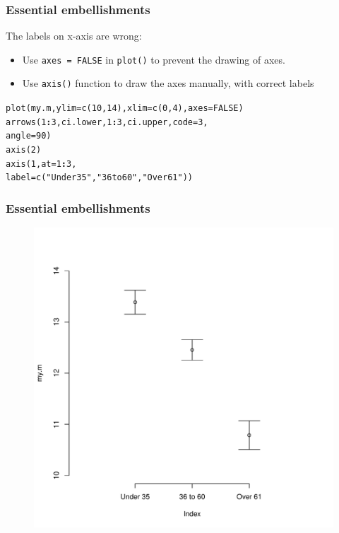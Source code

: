 \documentclass{beamer}\usepackage[]{graphicx}\usepackage[]{color}
\makeatletter
\newcommand{\hlnum}[1]{\textcolor[rgb]{0.533,0,0.133}{#1}}%
\newcommand{\hlstr}[1]{\textcolor[rgb]{0.667,0.267,0}{#1}}%
\newcommand{\hlopt}[1]{\textcolor[rgb]{0,0,0}{\textbf{#1}}}%
\newcommand{\hlstd}[1]{\textcolor[rgb]{0,0,0}{#1}}%
\newcommand{\hlkwc}[1]{\textcolor[rgb]{0,0,0.4}{#1}}%
\newcommand{\hlkwd}[1]{\textcolor[rgb]{0,0.267,0.4}{#1}}%
\newenvironment{kframe}{%
 \def\at@end@of@kframe{}%
 \ifinner\ifhmode%
  \def\at@end@of@kframe{\end{minipage}}%
  \begin{minipage}{\columnwidth}%
 \fi\fi%
 \def\FrameCommand##1{\hskip\@totalleftmargin \hskip-\fboxsep
 \colorbox{shadecolor}{##1}\hskip-\fboxsep
     \hskip-\linewidth \hskip-\@totalleftmargin \hskip\columnwidth}%
 \MakeFramed {\advance\hsize-\width
   \@totalleftmargin\z@ \linewidth\hsize
   \@setminipage}}%
 {\par\unskip\endMakeFramed%
 \at@end@of@kframe}
\newenvironment{knitrout}{}{} %
\makeatother
\begin{document}
\begin{frame}[fragile]
  \frametitle{Essential embellishments}
The labels on x-axis are wrong:
\begin{itemize}
\item Use \texttt{axes = FALSE} in \texttt{plot()} to prevent the drawing of axes.
\item Use \texttt{axis()} function to draw the axes manually, with correct labels
\end{itemize}
\begin{knitrout}
\color{fgcolor}\begin{kframe}
\begin{alltt}
\hlkwd{plot}\hlstd{(my.m,} \hlkwc{ylim} \hlstd{=} \hlkwd{c}\hlstd{(}\hlnum{10}\hlstd{,} \hlnum{14}\hlstd{),} \hlkwc{xlim} \hlstd{=} \hlkwd{c}\hlstd{(}\hlnum{0}\hlstd{,} \hlnum{4}\hlstd{),} \hlkwc{axes} \hlstd{=} \hlnum{FALSE}\hlstd{)}
\hlkwd{arrows}\hlstd{(}\hlnum{1}\hlopt{:}\hlnum{3}\hlstd{, ci.lower,} \hlnum{1}\hlopt{:}\hlnum{3}\hlstd{, ci.upper,} \hlkwc{code} \hlstd{=} \hlnum{3}\hlstd{,}
       \hlkwc{angle} \hlstd{=} \hlnum{90}\hlstd{)}
\hlkwd{axis}\hlstd{(}\hlnum{2}\hlstd{)}
\hlkwd{axis}\hlstd{(}\hlnum{1}\hlstd{,} \hlkwc{at} \hlstd{=} \hlnum{1}\hlopt{:}\hlnum{3}\hlstd{,}
     \hlkwc{label} \hlstd{=} \hlkwd{c}\hlstd{(}\hlstr{"Under 35"}\hlstd{,} \hlstr{"36 to 60"}\hlstd{,} \hlstr{"Over 61"}\hlstd{))}
\end{alltt}
\end{kframe}
\end{knitrout}
\end{frame}


\begin{frame}[fragile]
  \frametitle{Essential embellishments}

\begin{figure}[h]
  \vspace{-20pt}
  \centering
  \includegraphics[height = 0.7\textwidth, keepaspectratio]{Figure/m4}
  \label{fig:m4}
\end{figure}
\end{frame} 
\end{document}
